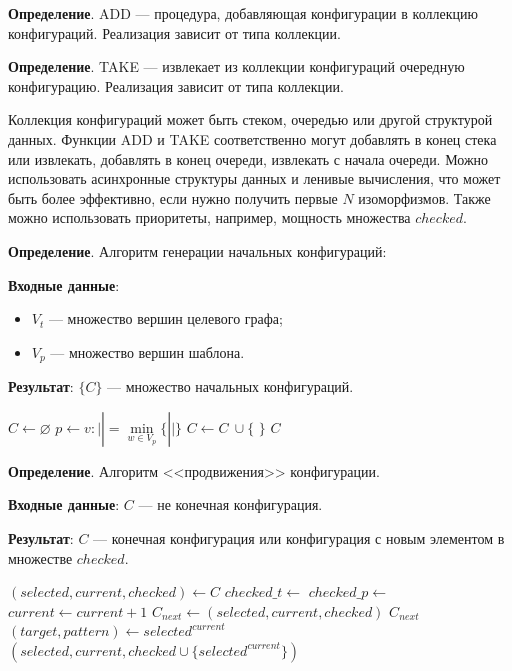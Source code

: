 \textbf{Определение}. ADD --- процедура, добавляющая конфигурации в
коллекцию конфигураций. Реализация зависит от типа коллекции.

\textbf{Определение}. TAKE --- извлекает из коллекции конфигураций
очередную конфигурацию. Реализация зависит от типа коллекции.

Коллекция конфигураций может быть стеком, очередью или другой структурой данных.
Функции ADD и TAKE соответственно могут добавлять в конец стека или извлекать,
добавлять в конец очереди, извлекать с начала очереди.
Можно использовать асинхронные структуры данных и ленивые вычисления,
что может быть более эффективно, если нужно получить первые $N$ изоморфизмов.
Также можно использовать приоритеты, например, мощность множества $checked$.

\textbf{Определение}. Алгоритм генерации начальных конфигураций:

\textbf{Входные данные}:
\begin{itemize}
\item $V_t$ --- множество вершин целевого графа;
\item $V_p$ --- множество вершин шаблона.
\end{itemize}

\textbf{Результат}: $\{ C \}$ --- множество начальных конфигураций.

\begin{algorithmic}
    \State $C \gets \varnothing$
    \State $p \gets v : |$$| = \min\limits_{w \in V_p} \{ |$$| \}$
            \State $C \gets C \ \cup \{$  $\}$
        \EndFor
    \EndFor
    \State \Return $C$
\EndFunction
\end{algorithmic}

\textbf{Определение}. Алгоритм <<продвижения>> конфигурации.

\textbf{Входные данные}: $C$ --- не конечная конфигурация.

\textbf{Результат}: $C$ --- конечная конфигурация или конфигурация с новым
элементом в множестве $checked$.

\begin{algorithmic}
    \State $(selected, current, checked) \gets C$
    \State $checked\_t \gets$ 
    \State $checked\_p \gets$ 
        \State $current \gets current + 1$
        \State $C_{next} \gets (selected, current, checked)$
            \State \Return $C_{next}$
        \EndIf
        \State $(target, pattern) \gets selected^{current}$
            \State \Return $(selected, current, checked \cup \{ selected^{current} \})$
        \EndIf
    \EndWhile
\EndFunction
\end{algorithmic}

